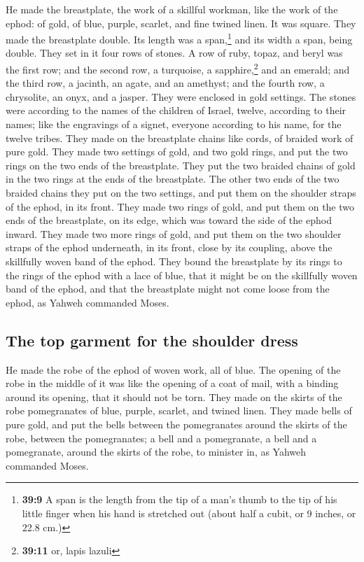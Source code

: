  He made the breastplate, the work of a skillful workman,
like the work of the ephod: of gold, of blue, purple, scarlet, and fine
twined linen.  It was square. They made the breastplate
double. Its length was a span,\footnote{\textbf{39:9} A span is the
  length from the tip of a man's thumb to the tip of his little finger
  when his hand is stretched out (about half a cubit, or 9 inches, or
  22.8 cm.)} and its width a span, being double.  They
set in it four rows of stones. A row of ruby, topaz, and beryl was the
first row;  and the second row, a turquoise, a
sapphire,\footnote{\textbf{39:11} or, lapis lazuli} and an emerald;
 and the third row, a jacinth, an agate, and an amethyst;
 and the fourth row, a chrysolite, an onyx, and a jasper.
They were enclosed in gold settings.  The stones were
according to the names of the children of Israel, twelve, according to
their names; like the engravings of a signet, everyone according to his
name, for the twelve tribes.  They made on the
breastplate chains like cords, of braided work of pure gold.
 They made two settings of gold, and two gold rings, and
put the two rings on the two ends of the breastplate. 
They put the two braided chains of gold in the two rings at the ends of
the breastplate.  The other two ends of the two braided
chains they put on the two settings, and put them on the shoulder straps
of the ephod, in its front.  They made two rings of gold,
and put them on the two ends of the breastplate, on its edge, which was
toward the side of the ephod inward.  They made two more
rings of gold, and put them on the two shoulder straps of the ephod
underneath, in its front, close by its coupling, above the skillfully
woven band of the ephod.  They bound the breastplate by
its rings to the rings of the ephod with a lace of blue, that it might
be on the skillfully woven band of the ephod, and that the breastplate
might not come loose from the ephod, as Yahweh commanded Moses.

\hypertarget{the-top-garment-for-the-shoulder-dress-1}{%
\subsection{The top garment for the shoulder
dress}\label{the-top-garment-for-the-shoulder-dress-1}}

 He made the robe of the ephod of woven work, all of
blue.  The opening of the robe in the middle of it was
like the opening of a coat of mail, with a binding around its opening,
that it should not be torn.  They made on the skirts of
the robe pomegranates of blue, purple, scarlet, and twined linen.
 They made bells of pure gold, and put the bells between
the pomegranates around the skirts of the robe, between the
pomegranates;  a bell and a pomegranate, a bell and a
pomegranate, around the skirts of the robe, to minister in, as Yahweh
commanded Moses.

